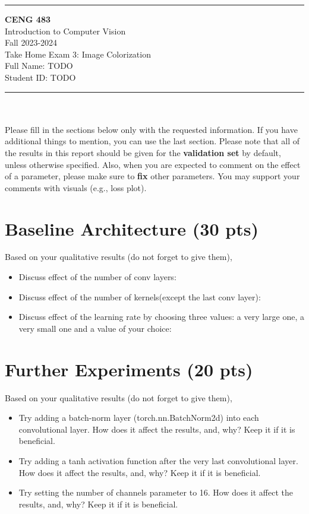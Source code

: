 \documentclass[12pt]{article}
\newcommand{\HRule}{\rule{\linewidth}{1mm}}
\begin{document}
\noindent
\HRule %
\small
\begin{center}
  \LARGE \textbf{CENG 483} \\[4mm]
  \Large Introduction to Computer Vision \\
  \normalsize Fall 2023-2024 \\
  \Large Take Home Exam 3: Image Colorization \\[4mm]
  \normalsize
  Full Name: TODO \\
  Student ID: TODO \\
\end{center}
\HRule

\begin{center}
\end{center}
\vspace{-10mm}
\noindent\\ \\ 
Please fill in the sections below only with the requested information. If you have additional things to mention, you can use the last section. Please note that all of the results in this report should be given for the \textbf{validation set} by default, unless otherwise specified. Also, when you are expected to comment on the effect of a parameter, please make sure to \textbf{fix} other parameters. You may support your comments with visuals (e.g., loss plot).

\section{Baseline Architecture (30 pts)}
Based on your qualitative results (do not forget to give them),
\begin{itemize}
  \item Discuss effect of the number of conv layers:
  \item Discuss effect of the number of kernels(except the last conv layer):
  \item Discuss effect of the learning rate by choosing three values: a very large one, a very small one and a value of your choice:
\end{itemize}


\section{Further Experiments (20 pts)}
Based on your qualitative results (do not forget to give them),
\begin{itemize}
  \item Try adding a batch-norm layer (torch.nn.BatchNorm2d) into each convolutional layer. How does it affect the results, and, why? Keep it if it is beneficial. 
  \item Try adding a tanh activation function after the very last convolutional layer. How does it affect the results, and, why? Keep it if it is beneficial. 
  \item Try setting the number of channels parameter to 16. How does it affect the results, and, why? Keep it if it is beneficial. 
\end{itemize}
\end{document}
